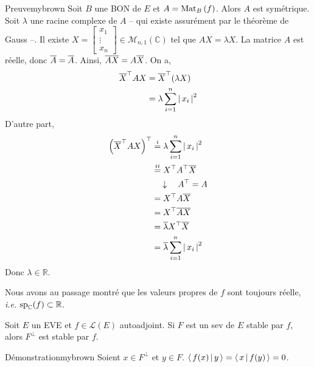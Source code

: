     \begin{demo}{Preuve}{mybrown}
        Soit $B$ une BON de $E$ et $A = \mat{B}{f}$. Alors $A$ est symétrique. Soit $\lambda$ une racine complexe de $A$ -- qui existe assurément par le théorème de Gauss --. Il existe $X  = \begin{bmatrix}
        x_1 \\
        \vdots \\
        x_n
        \end{bmatrix}\in \mathcal{M}_{n,1}(\mathbb{C})$ tel que $AX = \lambda X$. La matrice $A$ est réelle, donc $\ovl{A} = \ovl{A}$. Ainsi, $\ovl{AX} = A \ovl{X}$. On a,
        \begin{align*}
            \ovl{X}^{\top} A X 
            &= \ovl{X}^{\top} (\lambda X) \\
            &= \lambda \sum_{i=1}^{n} \abs{x_i}^2
        \end{align*}
        D’autre part, 
        \begin{align*}
            \left(\ovl{X}^{\top} A X \right)^{\top} &\overset{i}{=} \lambda \sum_{i=1}^{n} \abs{x_i}^2 \\
            &\overset{ii}{=} X^{\top} A^{\top} \ovl{X} \\
            & \quad \downarrow \quad A^{\top} = A \\
            &= X^{\top} A \ovl{X} \\
            &= X^{\top} \ovl{AX} \\
            &= \ovl{\lambda} X^{\top} \ovl{X} \\
            &= \ovl{\lambda} \sum_{i=1}^{n} \abs{x_i}^2
        \end{align*}
        Donc $\lambda \in \mathbb{R}$.
    \end{demo}

    Nous avons au passage montré que les valeurs propres de $f$ sont toujours réelle, \textit{i.e.} $\sp_{\mathbb{C}}(f) \subset \mathbb{R}$.

    \begin{lem}{}{}
        Soit $E$ un EVE et $f \in \mathcal{L}(E)$ autoadjoint. Si $F$ est un sev de $E$ stable par $f$, alors $F^{\perp}$ est stable par $f$. 
    \end{lem}

    \begin{demo}{Démonstration}{mybrown}
        Soient $x \in F^{\perp}$ et $y \in F$. $\spr{f(x)}{y} = \spr{x}{f(y)} = 0$.
    \end{demo}

